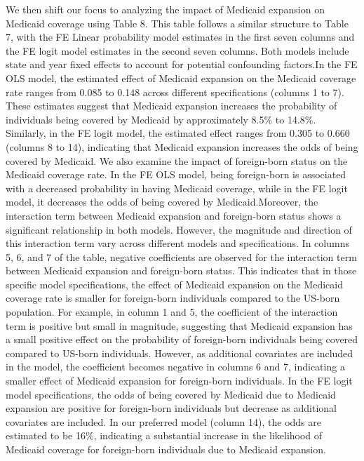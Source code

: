 \documentclass[
]{article}
\begin{document}
We then shift our focus to analyzing the impact of Medicaid expansion on
Medicaid coverage using Table 8. This table follows a similar structure
to Table 7, with the FE Linear probability model estimates in the first
seven columns and the FE logit model estimates in the second seven
columns. Both models include state and year fixed effects to account for
potential confounding factors.In the FE OLS model, the estimated effect
of Medicaid expansion on the Medicaid coverage rate ranges from 0.085 to
0.148 across different specifications (columns 1 to 7). These estimates
suggest that Medicaid expansion increases the probability of individuals
being covered by Medicaid by approximately 8.5\% to 14.8\%. Similarly,
in the FE logit model, the estimated effect ranges from 0.305 to 0.660
(columns 8 to 14), indicating that Medicaid expansion increases the odds
of being covered by Medicaid. We also examine the impact of foreign-born
status on the Medicaid coverage rate. In the FE OLS model, being
foreign-born is associated with a decreased probability in having
Medicaid coverage, while in the FE logit model, it decreases the odds of
being covered by Medicaid.Moreover, the interaction term between
Medicaid expansion and foreign-born status shows a significant
relationship in both models. However, the magnitude and direction of
this interaction term vary across different models and specifications.
In columns 5, 6, and 7 of the table, negative coefficients are observed
for the interaction term between Medicaid expansion and foreign-born
status. This indicates that in those specific model specifications, the
effect of Medicaid expansion on the Medicaid coverage rate is smaller
for foreign-born individuals compared to the US-born population. For
example, in column 1 and 5, the coefficient of the interaction term is
positive but small in magnitude, suggesting that Medicaid expansion has
a small positive effect on the probability of foreign-born individuals
being covered compared to US-born individuals. However, as additional
covariates are included in the model, the coefficient becomes negative
in columns 6 and 7, indicating a smaller effect of Medicaid expansion
for foreign-born individuals. In the FE logit model specifications, the
odds of being covered by Medicaid due to Medicaid expansion are positive
for foreign-born individuals but decrease as additional covariates are
included. In our preferred model (column 14), the odds are estimated to
be 16\%, indicating a substantial increase in the likelihood of Medicaid
coverage for foreign-born individuals due to Medicaid expansion.
\end{document}
